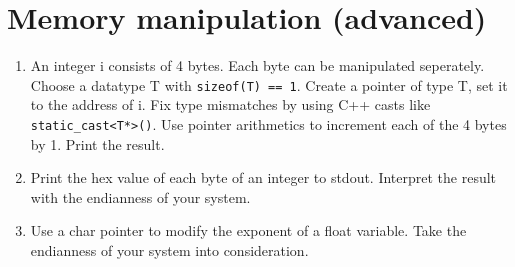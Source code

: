 \documentclass[12pt, a4paper]{article}
\begin{document}
\section*{Memory manipulation (advanced)}
\begin{enumerate}
    \item An integer i consists of 4 bytes. Each byte can be manipulated seperately. Choose a datatype T with \lstinline{sizeof(T) == 1}. Create a pointer of type T, set it to the address of i. Fix type mismatches by using C++ casts like \lstinline{static_cast<T*>()}. Use pointer arithmetics to increment each of the 4 bytes by 1. Print the result.
    \item Print the hex value of each byte of an integer to stdout. Interpret the result with the endianness of your system.
    \item Use a char pointer to modify the exponent of a float variable. Take the endianness of your system into consideration.
\end{enumerate}
\end{document}
